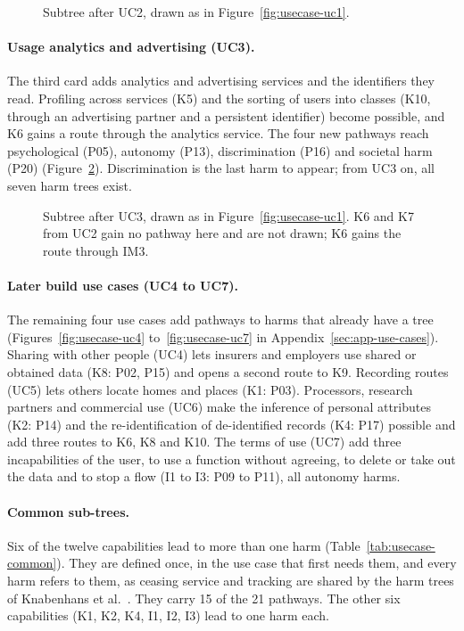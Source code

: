 \begin{figure}[H]
\centering

\caption[Subtree of UC2]{Subtree after UC2, drawn as in Figure~\ref{fig:usecase-uc1}.}
\label{fig:usecase-uc2}
\end{figure}

\paragraph{Usage analytics and advertising (UC3).} The third card adds analytics and advertising
services and the identifiers they read. Profiling across services (K5) and the sorting of users
into classes (K10, through an advertising partner and a persistent identifier) become possible,
and K6 gains a route through the analytics service. The four new pathways reach psychological
(P05), autonomy (P13), discrimination (P16) and societal harm (P20) (Figure~\ref{fig:usecase-uc3}).
Discrimination is the last harm to appear; from UC3 on, all seven harm trees exist.

\begin{figure}[H]
\centering

\caption[Subtree of UC3]{Subtree after UC3, drawn as in Figure~\ref{fig:usecase-uc1}. K6 and K7
from UC2 gain no pathway here and are not drawn; K6 gains the route through IM3.}
\label{fig:usecase-uc3}
\end{figure}

\paragraph{Later build use cases (UC4 to UC7).} The remaining four use cases add pathways to harms
that already have a tree (Figures~\ref{fig:usecase-uc4} to~\ref{fig:usecase-uc7} in
Appendix~\ref{sec:app-use-cases}). Sharing with
other people (UC4) lets insurers and employers use shared or obtained data (K8: P02, P15) and opens
a second route to K9. Recording routes (UC5) lets others locate homes and places (K1: P03).
Processors, research partners and commercial use (UC6) make the inference of personal attributes
(K2: P14) and the re-identification of de-identified records (K4: P17) possible and add three
routes to K6, K8 and K10. The terms of use (UC7) add three incapabilities of the user, to use a
function without agreeing, to delete or take out the data and to stop a flow (I1 to I3: P09 to
P11), all autonomy harms.

\paragraph{Common sub-trees.} Six of the twelve capabilities lead to more than one harm
(Table~\ref{tab:usecase-common}). They are defined once, in the use case that first needs them,
and every harm refers to them, as ceasing service and tracking are shared by the harm trees of
Knabenhans et al.~\parencite[Fig.~5]{knabenhans2026harms}. They carry 15 of the 21 pathways.
The other six capabilities (K1, K2, K4, I1, I2, I3) lead to one harm each.

